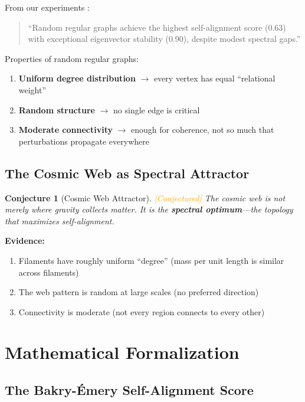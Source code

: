 \documentclass[11pt,a4paper]{article}
\theoremstyle{plain}
\newtheorem{conjecture}[theorem]{Conjecture}
\theoremstyle{definition}
\theoremstyle{remark}
\newcommand{\conjectured}{\textcolor{orange}{[Conjectured]}}
\begin{document}
From our experiments \cite{sat}:
\begin{quote}
``Random regular graphs achieve the highest self-alignment score (0.63) with exceptional eigenvector stability (0.90), despite modest spectral gaps.''
\end{quote}

Properties of random regular graphs:
\begin{enumerate}[noitemsep]
    \item \textbf{Uniform degree distribution} $\to$ every vertex has equal ``relational weight''
    \item \textbf{Random structure} $\to$ no single edge is critical
    \item \textbf{Moderate connectivity} $\to$ enough for coherence, not so much that perturbations propagate everywhere
\end{enumerate}

\subsection{The Cosmic Web as Spectral Attractor}

\begin{conjecture}[Cosmic Web Attractor] \conjectured
The cosmic web is not merely where gravity collects matter. It is the \textbf{spectral optimum}---the topology that maximizes self-alignment.
\end{conjecture}

\textbf{Evidence:}
\begin{enumerate}[noitemsep]
    \item Filaments have roughly uniform ``degree'' (mass per unit length is similar across filaments)
    \item The web pattern is random at large scales (no preferred direction)
    \item Connectivity is moderate (not every region connects to every other)
\end{enumerate}

\section{Mathematical Formalization}

\subsection{The Bakry-\'{E}mery Self-Alignment Score}
\end{document}
